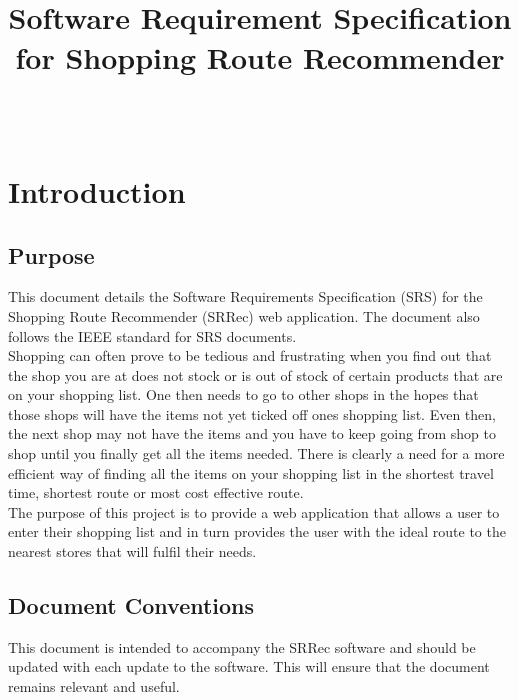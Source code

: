 \documentclass[10pt, a4paper, twocolumn]{scrartcl}
\begin{document}
\title{\normalfont \normalsize
	\horrule{0.5pt} \\ [10pt]
	\huge Software Requirement Specification for Shopping Route Recommender \\
	\horrule{2pt} \\ [10pt]}
\date {}

\maketitle
	
	\section{Introduction}
	
		\subsection{Purpose}
		
			This document details the Software Requirements Specification (SRS) for the Shopping Route Recommender (SRRec) web application. The document also follows the IEEE standard for SRS documents.\\
			
			Shopping can often prove to be tedious and frustrating when you find out that the shop you are at does not stock or is out of stock of certain products that are on your shopping list. One then needs to go to other shops in the hopes that those shops will have the items not yet ticked off ones shopping list. Even then, the next shop may not have the items and you have to keep going from shop to shop until you finally get all the items needed. There is clearly a need for a more efficient way of finding all the items on your shopping list in the shortest travel time, shortest route or most cost effective route.\\
			
			The purpose of this project is to provide a web application that allows a user to enter their shopping list and in turn provides the user with the ideal route to the nearest stores that will fulfil their needs.
		
		\subsection{Document Conventions}
		
			This document is intended to accompany the SRRec software and should be updated with each update to the software. This will ensure that the document remains relevant and useful.
		
\end{document}
